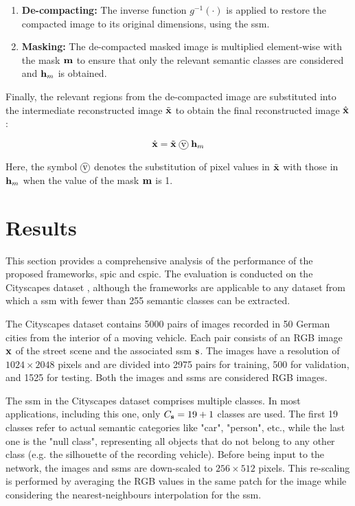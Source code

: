 \begin{enumerate}
    \item \textbf{De-compacting:} The inverse function $g^{-1}(\cdot)$ is applied to restore the compacted image to its original dimensions, using the \gls{ssm}.

    \item \textbf{Masking:} The de-compacted masked image is multiplied element-wise with the mask $\mathbf{m}$ to ensure that only the relevant semantic classes are considered and $\mathbf{h}_m$ is obtained.
\end{enumerate}

Finally, the relevant regions from the de-compacted image are substituted into the intermediate reconstructed image $\tilde{\mathbf{x}}$ to obtain the final reconstructed image $\hat{\mathbf{x}}$:

\[\hat{\x} = \tilde{\x} \;\circv\; \h_m\]

Here, the symbol $\circv$ denotes the substitution of pixel values in $\tilde{\mathbf{x}}$ with those in $\mathbf{h}_m$ when the value of the mask $\mathbf{m}$ is 1.\\


\section{Results}\label{sec: SPIC results}

This section provides a comprehensive analysis of the performance of the proposed frameworks, \gls{spic} and \gls{cspic}. The evaluation is conducted on the Cityscapes dataset \cite{Cordts2016Cityscapes}, although the frameworks are applicable to any dataset from which a \gls{ssm} with fewer than 255 semantic classes can be extracted.

The Cityscapes dataset contains 5000 pairs of images recorded in 50 German cities from the interior of a moving vehicle. Each pair consists of an RGB image $\mathbf{x}$ of the street scene and the associated \gls{ssm} $\mathbf{s}$. The images have a resolution of $1024\times2048$ pixels and are divided into 2975 pairs for training, 500 for validation, and 1525 for testing. Both the images and \glspl{ssm} are considered RGB images.

The \gls{ssm} in the Cityscapes dataset comprises multiple classes. In most applications, including this one, only $C_{\mathbf{s}}=19+1$ classes are used. The first 19 classes refer to actual semantic categories like "car", "person", etc., while the last one is the "null class", representing all objects that do not belong to any other class (e.g. the silhouette of the recording vehicle). Before being input to the network, the images and \gls{ssm}s are down-scaled to $256\times512$ pixels. This re-scaling is performed by averaging the RGB values in the same patch for the image while considering the  nearest-neighbours interpolation for the \gls{ssm}.


